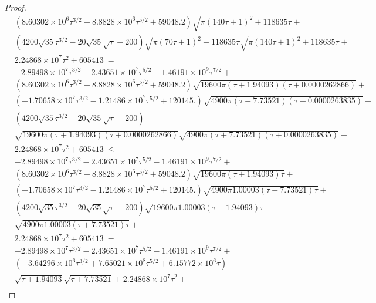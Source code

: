 \documentclass{article}
\renewcommand{\leq}{\leqslant}
\begin{document}
\begin{proof}
\begin{align}
&\left(8.60302\times 10^6 \tau^{3/2}+8.8828\times 10^6 \tau^{5/2}+59048.2\right) \sqrt{\pi  (140 \tau+1)^2+118635 \tau}+\\ \nonumber 
&\left(4200 \sqrt{35} \tau^{3/2}-20 \sqrt{35} \sqrt{\tau}+200\right) \sqrt{\pi  (70 \tau+1)^2+118635 \tau} \sqrt{\pi  (140 \tau+1)^2+118635 \tau}+\\ \nonumber 
&2.24868\times 10^7 \tau^2+605413\ = \\ \nonumber
&-2.89498\times 10^7 \tau^{3/2}-2.43651\times 10^7 \tau^{5/2}-1.46191\times 10^9 \tau^{7/2}+\\ \nonumber 
&\left(8.60302\times 10^6 \tau^{3/2}+8.8828\times 10^6 \tau^{5/2}+59048.2\right) \sqrt{19600 \pi  (\tau+1.94093) (\tau+0.0000262866)}+\\ \nonumber 
&\left(-1.70658\times 10^7 \tau^{3/2}-1.21486\times 10^7 \tau^{5/2}+120145.\right) \sqrt{4900 \pi  (\tau+7.73521) (\tau+0.0000263835)}+\\ \nonumber 
&\left(4200 \sqrt{35} \tau^{3/2}-20 \sqrt{35} \sqrt{\tau}+200\right) \\ \nonumber 
&\sqrt{19600 \pi  (\tau+1.94093) (\tau+0.0000262866)} \sqrt{4900 \pi  (\tau+7.73521) (\tau+0.0000263835)}+\\ \nonumber 
&2.24868\times 10^7 \tau^2+605413\ \leq \\ \nonumber 
&-2.89498\times 10^7 \tau^{3/2}-2.43651\times 10^7 \tau^{5/2}-1.46191\times 10^9 \tau^{7/2}+\\ \nonumber
&\left(8.60302\times 10^6 \tau^{3/2}+8.8828\times 10^6 \tau^{5/2}+59048.2\right) \sqrt{19600 \pi (\tau+1.94093) \tau}+\\ \nonumber 
&\left(-1.70658\times 10^7 \tau^{3/2}-1.21486\times 10^7 \tau^{5/2}+120145.\right) \sqrt{4900 \pi  1.00003 (\tau+7.73521) \tau}+\\ \nonumber 
&\left(4200 \sqrt{35} \tau^{3/2}-20 \sqrt{35} \sqrt{\tau}+200\right) \sqrt{19600 \pi  1.00003 (\tau+1.94093) \tau} \\ \nonumber 
&\sqrt{4900 \pi  1.00003 (\tau+7.73521) \tau}+\\ \nonumber 
&2.24868\times 10^7 \tau^2+605413\ = \\ \nonumber 
&-2.89498\times 10^7 \tau^{3/2}-2.43651\times 10^7 \tau^{5/2}-1.46191\times 10^9 \tau^{7/2}+\\ \nonumber 
&\left(-3.64296\times 10^6 \tau^{3/2}+7.65021\times 10^8 \tau^{5/2}+6.15772\times 10^6 \tau\right) \\ \nonumber 
&\sqrt{\tau+1.94093} \sqrt{\tau+7.73521}+2.24868\times 10^7 \tau^2+\\ \nonumber 

\end{align}
\end{proof}
\end{document}
